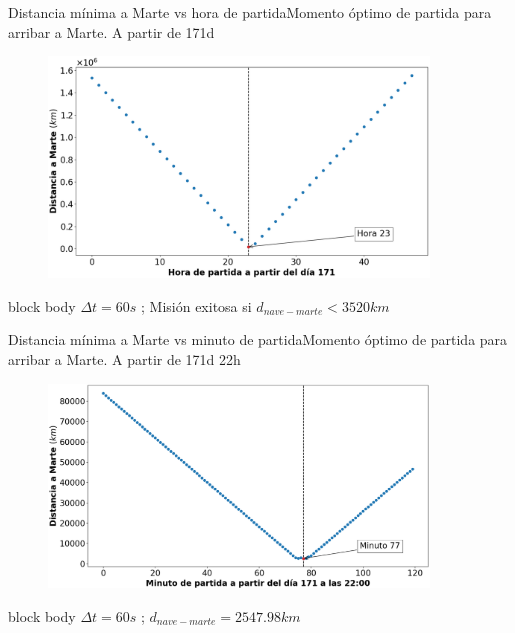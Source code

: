 \documentclass{beamer}
\begin{document}
            \begin{frame}{Distancia mínima a Marte vs hora de partida}{Momento óptimo de partida para arribar a Marte. A partir de 171d}
                \begin{figure}[H!]
                    \includegraphics[width=0.9\textwidth]{./distancia_a_marte_vs_hora_de_partida}
                    \label{fig:marte_6}
                \end{figure}
                \begin{beamercolorbox}[sep=5pt,center]{block body}
                    \centering
                    \small{$\Delta t = 60s$ ; Misión exitosa si $d_{nave-marte} < 3520 km$}
                \end{beamercolorbox}
            \end{frame}

            \begin{frame}{Distancia mínima a Marte vs minuto de partida}{Momento óptimo de partida para arribar a Marte. A partir de 171d 22h}
                \begin{figure}[H!]
                    \includegraphics[width=0.9\textwidth]{./distancia_a_marte_vs_minuto_de_partida}
                    \label{fig:marte_7}
                \end{figure}
                \begin{beamercolorbox}[sep=5pt,center]{block body}
                    \centering
                    \small{$\Delta t = 60s$ ; $d_{nave-marte} = 2547.98 km$}
                \end{beamercolorbox}
            \end{frame}
\end{document}

